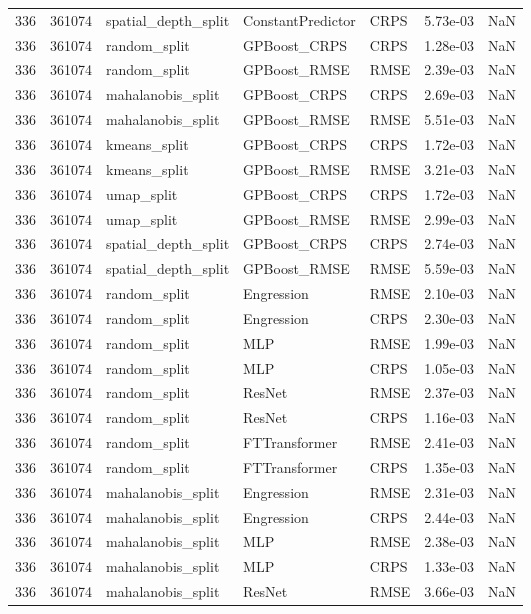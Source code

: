 \begin{tabular}{rrlllrr}
336 & 361074 & spatial\_depth\_split & ConstantPredictor & CRPS & 5.73e-03 & NaN \\
336 & 361074 & random\_split & GPBoost\_CRPS & CRPS & 1.28e-03 & NaN \\
336 & 361074 & random\_split & GPBoost\_RMSE & RMSE & 2.39e-03 & NaN \\
336 & 361074 & mahalanobis\_split & GPBoost\_CRPS & CRPS & 2.69e-03 & NaN \\
336 & 361074 & mahalanobis\_split & GPBoost\_RMSE & RMSE & 5.51e-03 & NaN \\
336 & 361074 & kmeans\_split & GPBoost\_CRPS & CRPS & 1.72e-03 & NaN \\
336 & 361074 & kmeans\_split & GPBoost\_RMSE & RMSE & 3.21e-03 & NaN \\
336 & 361074 & umap\_split & GPBoost\_CRPS & CRPS & 1.72e-03 & NaN \\
336 & 361074 & umap\_split & GPBoost\_RMSE & RMSE & 2.99e-03 & NaN \\
336 & 361074 & spatial\_depth\_split & GPBoost\_CRPS & CRPS & 2.74e-03 & NaN \\
336 & 361074 & spatial\_depth\_split & GPBoost\_RMSE & RMSE & 5.59e-03 & NaN \\
336 & 361074 & random\_split & Engression & RMSE & 2.10e-03 & NaN \\
336 & 361074 & random\_split & Engression & CRPS & 2.30e-03 & NaN \\
336 & 361074 & random\_split & MLP & RMSE & 1.99e-03 & NaN \\
336 & 361074 & random\_split & MLP & CRPS & 1.05e-03 & NaN \\
336 & 361074 & random\_split & ResNet & RMSE & 2.37e-03 & NaN \\
336 & 361074 & random\_split & ResNet & CRPS & 1.16e-03 & NaN \\
336 & 361074 & random\_split & FTTransformer & RMSE & 2.41e-03 & NaN \\
336 & 361074 & random\_split & FTTransformer & CRPS & 1.35e-03 & NaN \\
336 & 361074 & mahalanobis\_split & Engression & RMSE & 2.31e-03 & NaN \\
336 & 361074 & mahalanobis\_split & Engression & CRPS & 2.44e-03 & NaN \\
336 & 361074 & mahalanobis\_split & MLP & RMSE & 2.38e-03 & NaN \\
336 & 361074 & mahalanobis\_split & MLP & CRPS & 1.33e-03 & NaN \\
336 & 361074 & mahalanobis\_split & ResNet & RMSE & 3.66e-03 & NaN \\

\end{tabular}
